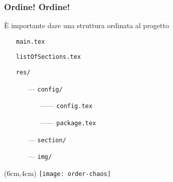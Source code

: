 \begin{frame}
 \frametitle{Ordine! Ordine!}
 
 È importante dare una struttura ordinata al progetto
 
 \begin{itemize}
  \item[] \texttt{main.tex}
  \item[] \texttt{listOfSections.tex}
  \item[] \texttt{res/}
  \begin{itemize}
    \item[---] \texttt{config/}
    \begin{itemize}
      \item[------] \texttt{config.tex}
      \item[------] \texttt{package.tex}
    \end{itemize}
    \item[---] \texttt{section/}
    \item[---] \texttt{img/}
  \end{itemize}
 \end{itemize}
 
 
 \begin{textblock*}{5cm}(6cm,4cm)
   \texttt{[image: order-chaos]}
 \end{textblock*}


\end{frame}
